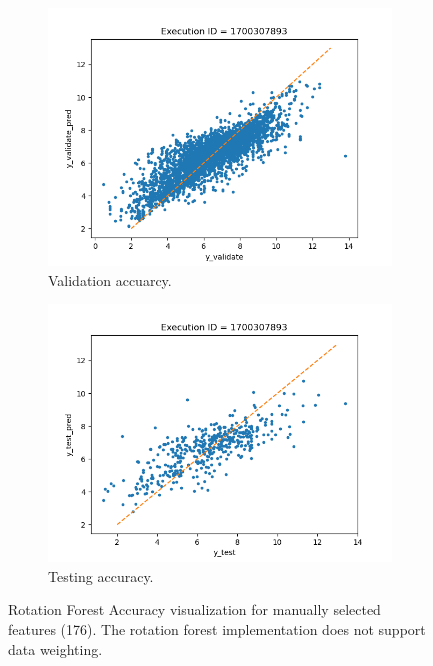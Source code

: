 \documentclass[11pt]{article}
\begin{document}
\begin{figure}
     \centering
     \begin{subfigure}[b]{0.45\textwidth}
         \centering
         \includegraphics[scale=0.45]{images/accuracyRotationFRvalidate}
         \caption{Validation accuarcy.}
        \label{fig:accuracyRotationFRvalidate}
     \end{subfigure}
     \hfill
     \begin{subfigure}[b]{0.45\textwidth}
         \centering
         \includegraphics[scale=0.45]{images/accuracyRotationFRtest}
        \caption{Testing accuracy.}
        \label{fig:accuracyRotationFRtest}
     \end{subfigure}
     \caption{Rotation Forest Accuracy visualization for manually selected features (176).  The rotation forest implementation does not support data weighting.}
     \label{fig:RotationForestAccuracy}
\end{figure}
\end{document}

